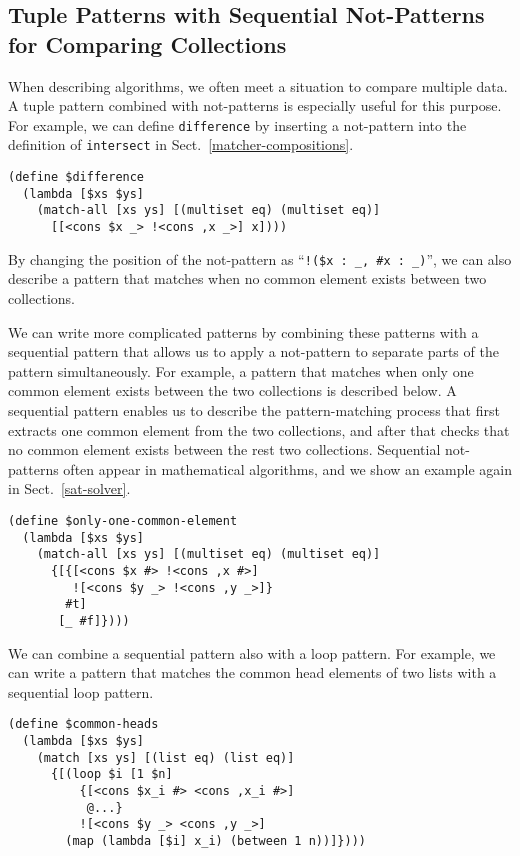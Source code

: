 \documentclass{article}
\begin{document}
\subsection{Tuple Patterns with Sequential Not-Patterns for Comparing Collections}\label{tuple-of-collections}

When describing algorithms, we often meet a situation to compare multiple data.
A tuple pattern combined with not-patterns is especially useful for this purpose.
For example, we can define \texttt{difference} by inserting a not-pattern into the definition of \texttt{intersect} in Sect.~\ref{matcher-compositions}.

\begin{lstlisting}[language=egison]
(define $difference
  (lambda [$xs $ys]
    (match-all [xs ys] [(multiset eq) (multiset eq)]
      [[<cons $x _> !<cons ,x _>] x])))
\end{lstlisting}

\noindent By changing the position of the not-pattern as ``\verb|!($x : _, #x : _)|'', we can also describe a pattern that matches when no common element exists between two collections.

We can write more complicated patterns by combining these patterns with a sequential pattern that allows us to apply a not-pattern to separate parts of the pattern simultaneously.
For example, a pattern that matches when only one common element exists between the two collections is described below.
A sequential pattern enables us to describe the pattern-matching process that first extracts one common element from the two collections, and after that checks that no common element exists between the rest two collections.
Sequential not-patterns often appear in mathematical algorithms, and we show an example again in Sect.~\ref{sat-solver}.

\begin{lstlisting}[language=egison]
(define $only-one-common-element
  (lambda [$xs $ys]
    (match-all [xs ys] [(multiset eq) (multiset eq)]
      {[{[<cons $x #> !<cons ,x #>]
         ![<cons $y _> !<cons ,y _>]}
        #t]
       [_ #f]})))
\end{lstlisting}

We can combine a sequential pattern also with a loop pattern.
For example, we can write a pattern that matches the common head elements of two lists with a sequential loop pattern.

\begin{lstlisting}[language=egison]
(define $common-heads
  (lambda [$xs $ys]
    (match [xs ys] [(list eq) (list eq)]
      {[(loop $i [1 $n]
          {[<cons $x_i #> <cons ,x_i #>]
           @...}
          ![<cons $y _> <cons ,y _>]
        (map (lambda [$i] x_i) (between 1 n))]})))
\end{lstlisting}
\end{document}
